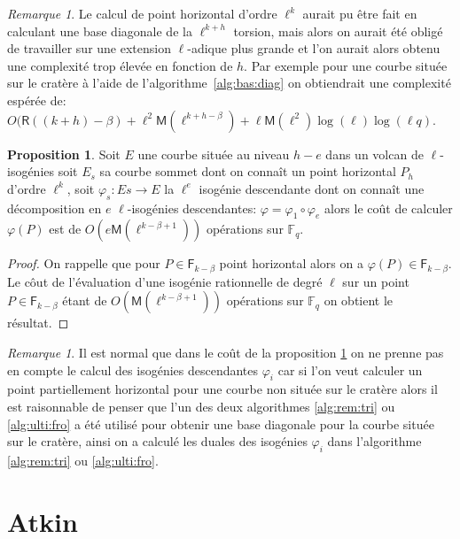 \documentclass[10pt,a4paper]{book}
\theoremstyle{plain}
\theoremstyle{definition}
\theoremstyle{definition}
\theoremstyle{definition}
\newtheorem{prop}[thm]{Proposition}
\theoremstyle{definition}
\theoremstyle{remark}
\newtheorem{rem}[thm]{Remarque}
\theoremstyle{remark}
\theoremstyle{definition}
\begin{document}
\begin{rem}
Le calcul de point horizontal d'ordre $\ell^k$ aurait pu être fait en calculant une base diagonale de la $\ell^{k+h}$ torsion, mais alors on aurait été obligé de travailler sur une extension $\ell$-adique plus grande et l'on aurait alors obtenu une complexité trop élevée en fonction de $h$. Par exemple pour une courbe située sur le cratère à l'aide de l'algorithme~\ref{alg:bas:diag} on obtiendrait une complexité espérée de: $O(\mathsf{R}((k+h)-\beta)+\ell^{2}\mathsf{M}(\ell^{k+h-\beta})+\ell\mathsf{M}(\ell^2)\log(\ell)\log(\ell q)$.
\end{rem}

\begin{prop}
\label{pro:par:hor}
Soit $E$ une courbe située au niveau $h-e$ dans un volcan de $\ell$-isogénies soit $E_s$ sa courbe sommet dont on connaît un point horizontal $P_h$ d'ordre $\ell^k$, soit $\varphi_s:Es \rightarrow E $ la $\ell^{e}$ isogénie descendante dont on connaît une décomposition en $e$ $\ell$-isogénies descendantes: $\varphi=\varphi_1 \circ \varphi_{e}$ alors le coût de calculer $\varphi(P)$ est de $O(e\mathsf{M}(\ell^{k-\beta+1}))$ opérations sur $\mathbb{F}_q$.
\end{prop}

\begin{proof}
On rappelle que pour $P \in \mathsf{F}_{k-\beta}$ point horizontal alors on a  $\varphi(P) \in \mathsf{F}_{k-\beta}$. Le côut de l'évaluation d'une isogénie rationnelle de degré $\ell$ sur un point $P \in \mathsf{F}_{k-\beta}$ étant de $O(\mathsf{M}(\ell^{k-\beta+1}))$ opérations sur $\mathbb{F}_q$ on obtient le résultat.
\end{proof}

\begin{rem}
Il est normal que dans le coût de la proposition \ref{pro:par:hor} on ne prenne pas en compte le calcul des isogénies descendantes $\varphi_i$ car si l'on veut calculer un point partiellement horizontal pour une courbe non située sur le cratère alors il est raisonnable de penser que l'un des deux algorithmes  \ref{alg:rem:tri} ou \ref{alg:ulti:fro} a été utilisé pour obtenir une base diagonale pour la courbe située sur le cratère, ainsi on a calculé les duales des isogénies $\varphi_i$ dans l'algorithme \ref{alg:rem:tri} ou \ref{alg:ulti:fro}.
\end{rem}


\section{Atkin}
\end{document}
